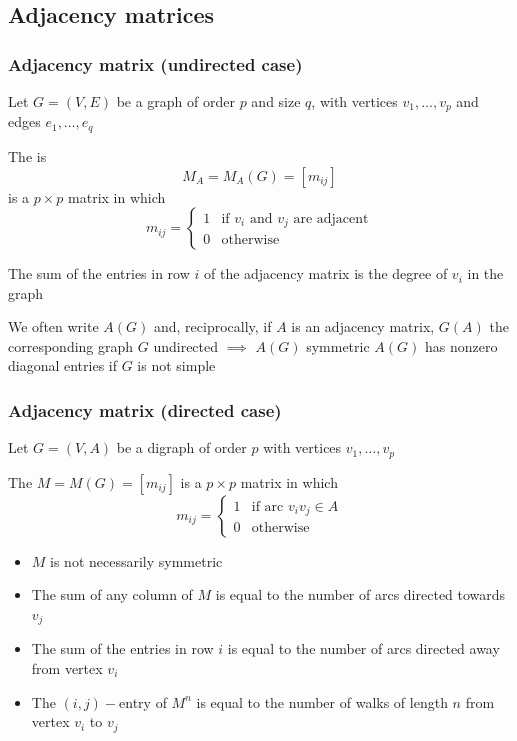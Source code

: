 \documentclass[aspectratio=169]{beamer}\usepackage[]{graphicx}\usepackage[]{xcolor}
\begin{document}
\subsection{Adjacency matrices}


\begin{frame}\frametitle{Adjacency matrix (undirected case)}
	Let $G=(V,E)$ be a graph of order $p$ and size $q$, with vertices $v_1, \ldots, v_p$ and edges $e_1, \dots , e_q$
	\begin{definition}
		The  is $$M_A=M_A(G)=[m_{ij}]$$ is a $p\times p$ matrix in which
		$$m_{ij}=\left \{ 
		\begin{array}{cc}
			1 & \textrm{if } v_i \textrm{ and } v_j \textrm{ are adjacent}\\
			0 & \textrm{otherwise}
		\end{array}
		\right .
		$$
	\end{definition}
\end{frame}

\begin{frame}
	\begin{theorem}
		The sum of the entries in row $i$ of the adjacency matrix is the degree of $v_i$ in the graph
	\end{theorem}
	\vfill
	We often write $A(G)$ and, reciprocally, if $A$ is an adjacency matrix, $G(A)$ the corresponding graph
	\vfill
	$G$ undirected $\implies$ $A(G)$ symmetric
	\vfill
	$A(G)$ has nonzero diagonal entries if $G$ is not simple
\end{frame}

\begin{frame}\frametitle{Adjacency matrix (directed case)}
	Let $G=(V,A)$ be a digraph of order $p$ with vertices $v_1,\ldots,v_p$
	\begin{definition}
	The  $M=M(G)=[m_{ij}]$ is a $p\times p$ matrix in which
	$$m_{ij}=\left \{ 
	\begin{array}{cl}
	1 & \textrm{if arc } v_iv_j \in A\\
	0 & \textrm{otherwise}
	\end{array}
	\right .
	$$
	\end{definition}
\end{frame}

\begin{frame}
	\begin{theorem}[{Properties}]
	\begin{itemize}
	\item $M$ is not necessarily symmetric
	\item The sum of any column of $M$ is equal to the number of arcs directed towards $v_j$
	\item The sum of the entries in row $i$ is equal to the number of arcs directed away from vertex $v_i$
	\item The $(i,j)-$entry of $M^n$ is equal to the number of walks of length $n$ from vertex $v_i$ to $v_j$
	\end{itemize}
	\end{theorem}
\end{frame}
	
\end{document}
